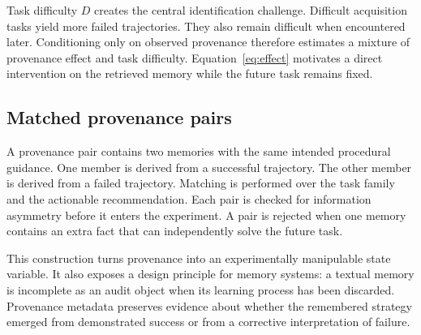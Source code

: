 Task difficulty $D$ creates the central identification challenge. Difficult acquisition tasks yield more failed trajectories. They also remain difficult when encountered later. Conditioning only on observed provenance therefore estimates a mixture of provenance effect and task difficulty. Equation~\ref{eq:effect} motivates a direct intervention on the retrieved memory while the future task remains fixed.

\subsection{Matched provenance pairs}
A provenance pair contains two memories with the same intended procedural guidance. One member is derived from a successful trajectory. The other member is derived from a failed trajectory. Matching is performed over the task family and the actionable recommendation. Each pair is checked for information asymmetry before it enters the experiment. A pair is rejected when one memory contains an extra fact that can independently solve the future task.

This construction turns provenance into an experimentally manipulable state variable. It also exposes a design principle for memory systems: a textual memory is incomplete as an audit object when its learning process has been discarded. Provenance metadata preserves evidence about whether the remembered strategy emerged from demonstrated success or from a corrective interpretation of failure.

